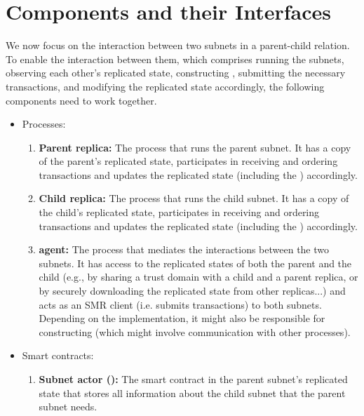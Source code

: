  \section{Components and their Interfaces}
 \label{sec:components}

We now focus on the interaction between two subnets in a parent-child relation.
To enable the interaction between them, which comprises running the subnets, observing each other's replicated state,
constructing \pofsFull, submitting the necessary transactions, and modifying the replicated state accordingly,
the following components need to work together.\\

\begin{itemize}
    \item Processes:
        \begin{enumerate}
            \item \textbf{Parent replica:} The process that runs the parent subnet. It has a copy of the parent's replicated state, participates in receiving and ordering transactions and updates the replicated state (including the \sa \dapp) accordingly.
            \item \textbf{Child replica:} The process that runs the child subnet. It has a copy of the child's replicated state, participates in receiving and ordering transactions and updates the replicated state (including the \gw \dapp) accordingly.
            \item \textbf{\ipc agent:} The process that mediates the interactions between the two subnets.
            It has access to the replicated states of both the parent and the child
            (e.g., by sharing a trust domain with a child and a parent replica, or by securely downloading the replicated state from other replicas...)
            and acts as an SMR client (i.e. submits transactions) to both subnets.
            Depending on the implementation, it might also be responsible for constructing \pofsFull (which might involve communication with other processes).
        \end{enumerate}
    \item Smart contracts:
        \begin{enumerate}
            \item \textbf{Subnet actor (\sa):} The smart contract in the parent subnet's replicated state
            that stores all information about the child subnet that the parent subnet needs.

\end{enumerate}
\end{itemize}
